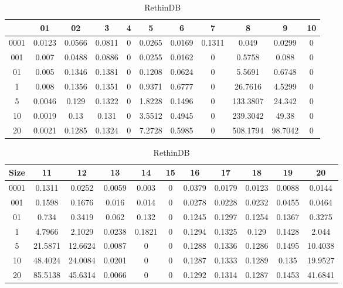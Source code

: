 \begin{center}
\begin{table} [ht]
\tiny
\caption{RethinDB}
\label{rethink-query-result-table}
\begin{tabular}{|c|c|c|c|c|c|c|c|c|c|c| } 
    &  01 & 02 & 3 & 4 & 5 & 6 & 7 & 8 & 9 & 10 \\
 \hline
0001 & 0.0123 & 0.0566 & 0.0811 & 0 & 0.0265 & 0.0169 & 0.1311 & 0.049 & 0.0299 & 0	\\
001 & 0.007 & 0.0488 & 0.0886 & 0 & 0.0255 & 0.0162 & 0 & 0.5758 & 0.088 & 0	\\
01 & 0.005 & 0.1346 & 0.1381 & 0 & 0.1208 & 0.0624 & 0 & 5.5691 & 0.6748 & 0	\\
1 & 0.008 & 0.1356 & 0.1351 & 0 & 0.9371 & 0.6777 & 0 & 26.7616 & 4.5299 & 0	\\
5 & 0.0046 & 0.129 & 0.1322 & 0 & 1.8228 & 0.1496 & 0 & 133.3807 & 24.342 & 0	\\
10 & 0.0019 & 0.13 & 0.131 & 0 & 3.5512 & 0.4945 & 0 & 239.3042 & 49.38 & 0	\\
20 & 0.0021 & 0.1285 & 0.1324 & 0 & 7.2728 & 0.5985 & 0 & 508.1794 & 98.7042 & 0	\\

\end{tabular}
\begin{tabular}{|c|c|c|c|c|c|c|c|c|c|c| } 
Size & 11 & 12 & 13 & 14 & 15 & 16 & 17 & 18 & 19 & 20	\\
\hline
0001 & 0.1311 & 0.0252 & 0.0059 & 0.003 & 0 & 0.0379 & 0.0179 & 0.0123 & 0.0088 & 0.0144	\\
001 & 0.1598 & 0.1676 & 0.016 & 0.014 & 0 & 0.0278 & 0.0228 & 0.0232 & 0.0455 & 0.0464	\\
01 & 0.734 & 0.3419 & 0.062 & 0.132 & 0 & 0.1245 & 0.1297 & 0.1254 & 0.1367 & 0.3275	\\
1 & 4.7966 & 2.1029 & 0.0238 & 0.1821 & 0 & 0.1294 & 0.1325 & 0.129 & 0.1428 & 2.044	\\
5 & 21.5871 & 12.6624 & 0.0087 & 0 & 0 & 0.1288 & 0.1336 & 0.1286 & 0.1495 & 10.4038	\\
10 & 48.4024 & 24.0084 & 0.0201 & 0 & 0 & 0.1287 & 0.1333 & 0.1289 & 0.135 & 19.9527	\\
20 & 85.5138 & 45.6314 & 0.0066 & 0 & 0 & 0.1292 & 0.1314 & 0.1287 & 0.1453 & 41.6841	\\

\end{tabular}
\end{table}



\end{center}
